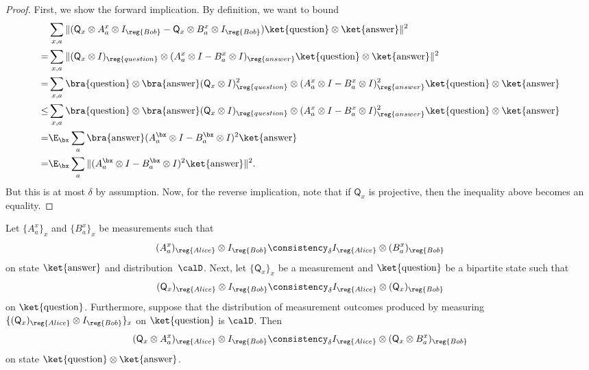 \begin{proof}
First, we show the forward implication. By definition, we want to bound
\begin{align*}
&\sum_{x, a} \Vert (\mathsf{Q}_x \otimes A^x_a \otimes I_{\reg{Bob}} - \mathsf{Q}_x \otimes B^x_a \otimes I_{\reg{Bob}}) \ket{\mathrm{question}}\otimes \ket{\mathrm{answer}}\Vert^2\\
=& \sum_{x, a} \Vert (\mathsf{Q}_x \otimes I)_{\reg{question}} \otimes (A^x_a \otimes I -   B^x_a \otimes I)_{\reg{answer}} \ket{\mathrm{question}}\otimes \ket{\mathrm{answer}}\Vert^2\\
=& \sum_{x, a} \bra{\mathrm{question}}\otimes \bra{\mathrm{answer}}
	(\mathsf{Q}_x \otimes I)^2_{\reg{question}} \otimes (A^x_a \otimes I -   B^x_a \otimes I)_{\reg{answer}}^2 \ket{\mathrm{question}}\otimes \ket{\mathrm{answer}}\\
\leq& \sum_{x, a} \bra{\mathrm{question}}\otimes \bra{\mathrm{answer}}
	(\mathsf{Q}_x \otimes I)_{\reg{question}} \otimes (A^x_a \otimes I -   B^x_a \otimes I)_{\reg{answer}}^2 \ket{\mathrm{question}}\otimes \ket{\mathrm{answer}}\\
=& \E_{\bx} \sum_{a} \bra{\mathrm{answer}}
	(A^{\bx}_a \otimes I -   B^{\bx}_a \otimes I)^2 \ket{\mathrm{answer}}\\
=& \E_{\bx} \sum_{a} \Vert (A^{\bx}_a \otimes I -   B^{\bx}_a \otimes I)^2\ket{\mathrm{answer}}\Vert^2.
\end{align*}
But this is at most $\delta$ by assumption. Now, for the reverse
implication, note that if $\mathsf{Q}_x$ is projective, then the
inequality above becomes an equality.
\end{proof}

\begin{fact}\label{fact:introspective-consistency}
Let $\{A^x_a\}_x$ and $\{B^x_a\}_x$ be measurements such that
\begin{equation}\label{eq:outro-approx}
(A^x_a)_{\reg{Alice}} \otimes I_{\reg{Bob}} \consistency_\delta I_{\reg{Alice}} \otimes (B^x_a)_{\reg{Bob}}
\end{equation}
on state $\ket{\mathrm{answer}}$ and distribution~$\calD$. Next, let $\{\mathsf{Q}_x\}_x$ be a measurement and $\ket{\mathrm{question}}$ be a bipartite state
such that
\begin{equation*}
(\mathsf{Q}_x)_{\reg{Alice}} \otimes I_{\reg{Bob}} \consistency_\delta I_{\reg{Alice}} \otimes (\mathsf{Q}_x)_{\reg{Bob}}
\end{equation*}
on $\ket{\mathrm{question}}$.
Furthermore, suppose that the distribution of measurement outcomes produced by measuring $\{(\mathsf{Q}_x)_{\reg{Alice}} \otimes I_{\reg{Bob}}\}_x$ on $\ket{\mathrm{question}}$ is $\calD$.
Then
\begin{equation}\label{eq:intro-approx}
(\mathsf{Q}_x \otimes A^x_a)_{\reg{Alice}} \otimes I_{\reg{Bob}} \consistency_{\delta} I_{\reg{Alice}} \otimes (\mathsf{Q}_x \otimes B^x_a)_{\reg{Bob}}
\end{equation}
on state $\ket{\mathrm{question}}\otimes
\ket{\mathrm{answer}}$.
\end{fact}

